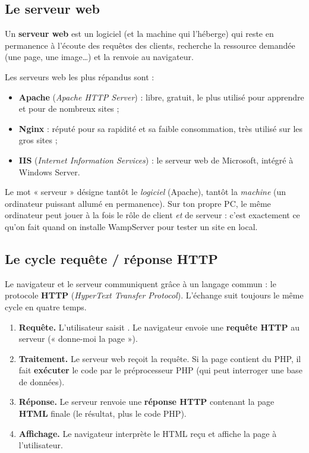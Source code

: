 \subsection{Le serveur web}

\begin{definition}
Un \textbf{serveur web} est un logiciel (et la machine qui l'héberge) qui reste en
permanence à l'écoute des requêtes des clients, recherche la ressource demandée
(une page, une image\dots) et la renvoie au navigateur.
\end{definition}

Les serveurs web les plus répandus sont :
\begin{itemize}
  \item \textbf{Apache} (\emph{Apache HTTP Server}) : libre, gratuit, le plus utilisé
        pour apprendre et pour de nombreux sites ;
  \item \textbf{Nginx} : réputé pour sa rapidité et sa faible consommation, très
        utilisé sur les gros sites ;
  \item \textbf{IIS} (\emph{Internet Information Services}) : le serveur web de
        Microsoft, intégré à Windows Server.
\end{itemize}

\begin{remarque}
Le mot « serveur » désigne tantôt le \emph{logiciel} (Apache), tantôt la
\emph{machine} (un ordinateur puissant allumé en permanence). Sur ton propre PC, le
même ordinateur peut jouer à la fois le rôle de client \emph{et} de serveur : c'est
exactement ce qu'on fait quand on installe WampServer pour tester un site en local.
\end{remarque}

\subsection{Le cycle requête / réponse HTTP}

Le navigateur et le serveur communiquent grâce à un langage commun : le protocole
\textbf{HTTP} (\emph{HyperText Transfer Protocol}). L'échange suit toujours le même
cycle en quatre temps.

\begin{enumerate}[label=\arabic*)]
  \item \textbf{Requête.} L'utilisateur saisit .
        Le navigateur envoie une \textbf{requête HTTP} au serveur (« donne-moi la
        page  »).
  \item \textbf{Traitement.} Le serveur web reçoit la requête. Si la page contient
        du PHP, il fait \textbf{exécuter} le code par le préprocesseur PHP (qui peut
        interroger une base de données).
  \item \textbf{Réponse.} Le serveur renvoie une \textbf{réponse HTTP} contenant la
        page \textbf{HTML} finale (le résultat, plus le code PHP).
  \item \textbf{Affichage.} Le navigateur interprète le HTML reçu et affiche la page
        à l'utilisateur.
\end{enumerate}

